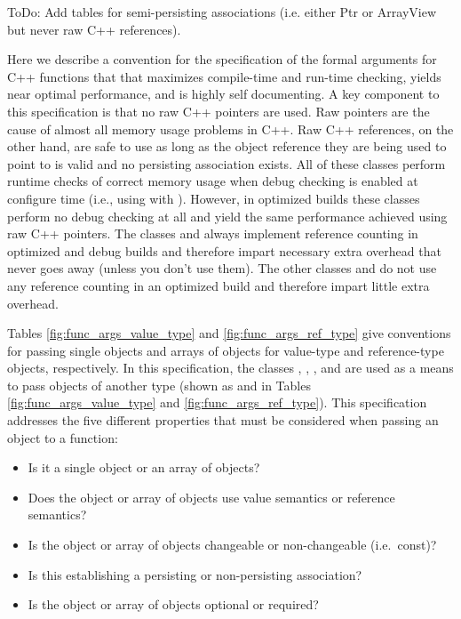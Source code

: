 \documentclass[pdf,ps2pdf,11pt]{SANDreport}
\begin{document}
ToDo: Add tables for semi-persisting associations (i.e. either Ptr or
ArrayView but never raw C++ references).


Here we describe a convention for the specification of the formal
arguments for C++ functions that that maximizes compile-time and
run-time checking, yields near optimal performance, and is highly self
documenting.  A key component to this specification is that no raw C++
pointers are used.  Raw pointers are the cause of almost all memory
usage problems in C++.  Raw C++ references, on the other hand, are
safe to use as long as the object reference they are being used to
point to is valid and no persisting association exists.  All of these
classes perform runtime checks of correct memory usage when debug
checking is enabled at configure time (i.e., using
{} with {}).
However, in optimized builds these classes perform no debug checking
at all and yield the same performance achieved using raw C++ pointers.
The classes {} and {} always implement
reference counting in optimized and debug builds and therefore impart
necessary extra overhead that never goes away (unless you don't use
them).  The other classes {} and {} do
not use any reference counting in an optimized build and therefore
impart little extra overhead.

Tables {}\ref{fig:func_args_value_type} and
{}\ref{fig:func_args_ref_type} give conventions for passing single
objects and arrays of objects for value-type {} and reference-type {} objects,
respectively.  In this specification, the classes
{}, {},
{}, and {}
are used as a means to pass objects of another type (shown as
{} and {} in Tables
{}\ref{fig:func_args_value_type} and {}\ref{fig:func_args_ref_type}).
This specification addresses the five different properties that must
be considered when passing an object to a function:

\begin{itemize}

{}\item Is it a single object or an array of objects?

{}\item Does the object or array of objects use value semantics or
reference semantics?

{}\item Is the object or array of objects changeable or non-changeable
(i.e.\ const)?

{}\item Is this establishing a persisting or non-persisting association?

{}\item Is the object or array of objects optional or required?

\end{itemize}
\end{document}
